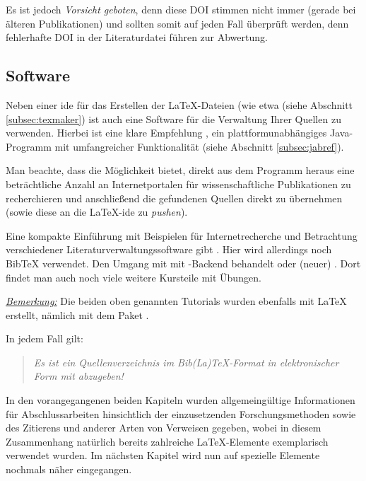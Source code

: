 Es ist jedoch \emph{Vorsicht geboten}, denn diese DOI stimmen nicht immer (gerade bei älteren Publikationen) und sollten somit auf jeden Fall überprüft werden, denn fehlerhafte DOI in der Literaturdatei führen zur
Abwertung.
%
\subsection{Software}
\label{subsec:ZR-WH-Software}
%
Neben einer \gls{ide} für das Erstellen der \LaTeX{}-Dateien (wie etwa  (siehe Abschnitt
\ref{subsec:texmaker}) ist auch eine Software für die Verwaltung Ihrer Quellen zu verwenden. Hierbei 
ist eine klare Empfehlung , ein plattformunabhängiges Java-Programm mit umfangreicher
Funktionalität (siehe Abschnitt \ref{subsec:jabref}).

Man beachte, dass  die Möglichkeit bietet, direkt aus dem Programm heraus eine
beträchtliche Anzahl an Internetportalen für wissenschaftliche Publikationen zu recherchieren
und anschließend die gefundenen Quellen
direkt zu übernehmen (sowie diese an die \LaTeX{}-\gls{ide} zu \emph{pushen}).

Eine kompakte Einführung mit Beispielen für Internetrecherche und Betrachtung verschiedener 
Literaturverwaltungssoftware gibt \textcite{Partosch2011}. Hier wird allerdings noch Bib\TeX{} verwendet.
Den Umgang mit  mit -Backend behandelt \textcite{Pospiech2011} oder
(neuer) \textcite{Frank2017}. Dort findet man auch noch viele weitere Kursteile mit Übungen.
%

\underline{\emph{Bemerkung:}} Die beiden oben genannten Tutorials wurden ebenfalls mit \LaTeX{}
erstellt, nämlich mit dem Paket .
%

In jedem Fall gilt:
%
\begin{quote}
\textsl{Es ist ein Quellenverzeichnis im Bib(La)\TeX{}-Format in elektronischer Form mit abzugeben!}
\end{quote}
%

In den vorangegangenen beiden Kapiteln wurden allgemeingültige Informationen für Abschlussarbeiten
hinsichtlich der einzusetzenden
Forschungsmethoden sowie des Zitierens und anderer Arten von Verweisen gegeben, wobei in diesem Zusammenhang
natürlich bereits zahlreiche \LaTeX{}-Elemente exemplarisch verwendet wurden. Im nächsten Kapitel wird nun auf
spezielle Elemente nochmals näher eingegangen.
%
%
